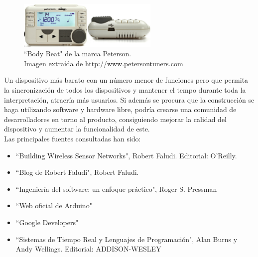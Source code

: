 \begin{figure}[htb]
\centering
\captionsetup{justification=centering}
\includegraphics[width=0.6\textwidth]{./imagenes/bodybeat}
\caption{``Body Beat" de la marca Peterson.\\
\scriptsize{Imagen extraída de http://www.petersontuners.com} \label{fig:bodybeat}}
\end{figure}

Un dispositivo más barato con un número menor de funciones pero que permita la sincronización de todos
los dispositivos y mantener el tempo durante toda la interpretación, atraería más usuarios. Si además
se procura que la construcción se haga utilizando software y hardware libre, podría crearse una comunidad
de desarrolladores en torno al producto, consiguiendo mejorar la calidad del dispositivo y aumentar la funcionalidad
de este.\\

Las principales fuentes consultadas han sido:
\begin{itemize}
  \item ``Building Wireless Sensor Networks", Robert Faludi. Editorial: O’Reilly. \cite{faludi}
  \item ``Blog de Robert Faludi", Robert Faludi. \cite{faludiBlog}
  \item ``Ingeniería del software: un enfoque práctico", Roger S. Pressman \cite{pressman}
  \item ``Web oficial de Arduino" \cite{arduinoWeb}
  \item ``Google Developers" \cite{googledevelopers}
  \item ``Sistemas de Tiempo Real y Lenguajes de Programación", Alan Burns y Andy Wellings. Editorial: ADDISON-WESLEY \cite{sistemastiemporealyprogramacion}
\end{itemize}

